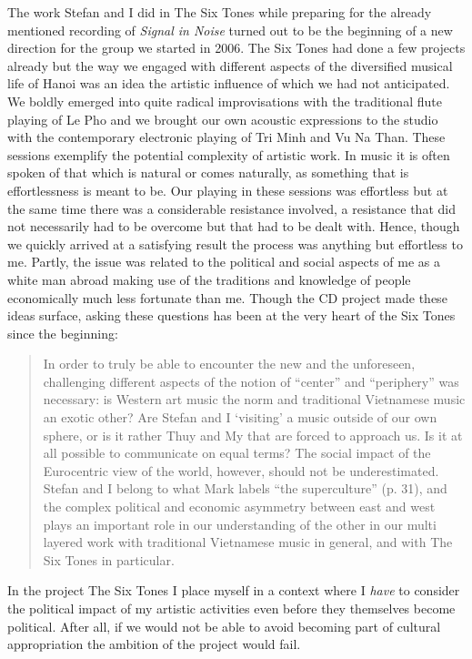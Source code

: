 \documentclass[a4paper]{article}
\begin{document}
The work Stefan and I did in The Six Tones while preparing for the already mentioned recording of \emph{Signal in Noise} turned out to be the beginning of a new direction for the group we started in 2006. The Six Tones had done a few projects already but the way we engaged with different aspects of the diversified musical life of Hanoi was an idea the artistic influence of which we had not anticipated. We boldly emerged into quite radical improvisations with the traditional flute playing of Le Pho and we brought our own acoustic expressions to the studio with the contemporary electronic playing of Tri Minh and Vu Na Than. These sessions exemplify the potential complexity of artistic work. In music it is often spoken of that which is natural or comes naturally, as something that is effortlessness is meant to be. Our playing in these sessions was effortless but at the same time there was a considerable resistance involved, a resistance that did not necessarily had to be overcome but that had to be dealt with. Hence, though we quickly arrived at a satisfying result the process was anything but effortless to me. Partly, the issue was related to the political and social aspects of me as a white man abroad making use of the traditions and knowledge of people economically much less fortunate than me. Though the CD project made these ideas surface, asking these questions has been at the very heart of the Six Tones since the beginning:

\begin{quote}
  In order to truly be able to encounter the new and the unforeseen,
  challenging different aspects of the notion of ``center'' and
  ``periphery'' was necessary: is Western art music the norm and
  traditional Vietnamese music an exotic other? Are Stefan and I
  `visiting' a music outside of our own sphere, or is it rather Thuy
  and My that are forced to approach us. Is it at all possible to
  communicate on equal terms? The social impact of the Eurocentric
  view of the world, however, should not be underestimated. Stefan and
  I belong to what Mark \citet{slobin1987} labels ``the superculture''
  (p. 31), and the complex political and economic asymmetry between
  east and west plays an important role in our understanding of the
  other in our multi layered work with traditional Vietnamese music in
  general, and with The Six Tones in particular. \citep{frisk12-improv}
\end{quote}

In the project The Six Tones I place myself in a context where I \emph{have} to consider the political impact of my artistic activities even before they themselves become political. After all, if we would not be able to avoid becoming part of cultural appropriation the ambition of the project would fail.
\end{document}
